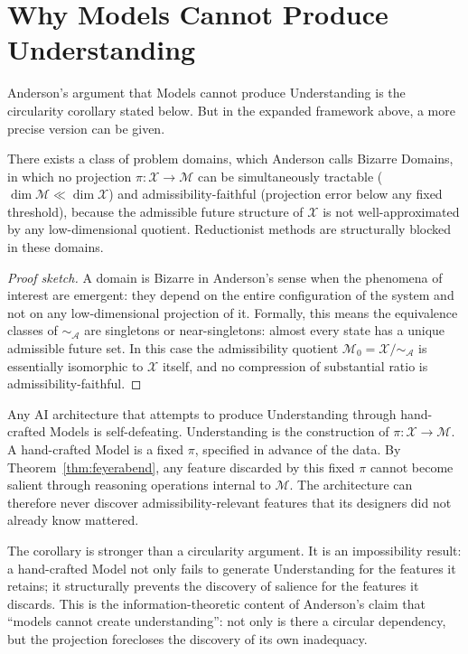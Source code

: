 \documentclass[12pt, a4paper, oneside]{book}
\newcommand{\Adm}{\mathcal{A}}
\newcommand{\X}{\mathcal{X}}
\newcommand{\M}{\mathcal{M}}
\newcommand{\proj}{\pi}
\newcommand{\SA}{{\sim_{\!\Adm}}}
\begin{document}
\section{Why Models Cannot Produce Understanding}

Anderson's argument that Models cannot produce Understanding is the
circularity corollary stated below.
But in the expanded framework above, a more precise version can be given.

\begin{proposition}
\label{prop:barrier}
There exists a class of problem domains, which Anderson calls
Bizarre Domains, in which no projection $\proj : \X \to \M$ can be
simultaneously tractable ($\dim \M \ll \dim \X$) and admissibility-faithful
(projection error below any fixed threshold), because the admissible
future structure of $\X$ is not well-approximated by any low-dimensional
quotient. Reductionist methods are structurally blocked in these domains.
\end{proposition}

\begin{proof}[Proof sketch]
A domain is Bizarre in Anderson's sense when the phenomena of interest
are emergent: they depend on the entire configuration of the system and
not on any low-dimensional projection of it. Formally, this means the
equivalence classes of $\SA$ are singletons or near-singletons:
almost every state has a unique admissible future set. In this case the
admissibility quotient $\M_0 = \X/\SA$ is essentially isomorphic to $\X$
itself, and no compression of substantial ratio is admissibility-faithful.
\end{proof}

\begin{corollary}
\label{cor:circularity}
Any AI architecture that attempts to produce Understanding through
hand-crafted Models is self-defeating. Understanding is the construction
of $\proj : \X \to \M$. A hand-crafted Model is a fixed $\proj$,
specified in advance of the data. By Theorem~\ref{thm:feyerabend},
any feature discarded by this fixed $\proj$ cannot become salient
through reasoning operations internal to $\M$.
The architecture can therefore never discover admissibility-relevant
features that its designers did not already know mattered.
\end{corollary}

\begin{remark}
The corollary is stronger than a circularity argument.
It is an impossibility result: a hand-crafted Model not only fails to
generate Understanding for the features it retains; it structurally
prevents the discovery of salience for the features it discards.
This is the information-theoretic content of Anderson's claim that
``models cannot create understanding'': not only is there a circular
dependency, but the projection forecloses the discovery of its own
inadequacy.
\end{remark}
\end{document}
